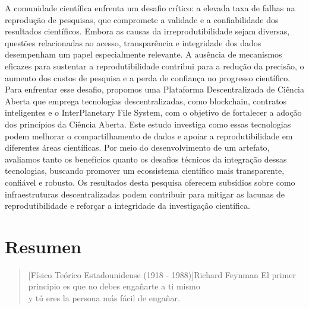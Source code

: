 \documentclass[final]{rc-book-2.14}
\begin{document}
\drop A comunidade científica enfrenta um desafio crítico: a elevada taxa de falhas na reprodução de pesquisas, que compromete a validade e a confiabilidade dos resultados científicos. Embora as causas da irreprodutibilidade sejam diversas, questões relacionadas ao acesso, transparência e integridade dos dados desempenham um papel especialmente relevante. A ausência de mecanismos eficazes para sustentar a reprodutibilidade contribui para a redução da precisão, o aumento dos custos de pesquisa e a perda de confiança no progresso científico. Para enfrentar esse desafio, propomos uma Plataforma Descentralizada de Ciência Aberta que emprega tecnologias descentralizadas, como blockchain, contratos inteligentes e o InterPlanetary File System, com o objetivo de fortalecer a adoção dos princípios da Ciência Aberta. Este estudo investiga como essas tecnologias podem melhorar o compartilhamento de dados e apoiar a reprodutibilidade em diferentes áreas científicas. Por meio do desenvolvimento de um artefato, avaliamos tanto os benefícios quanto os desafios técnicos da integração dessas tecnologias, buscando promover um ecossistema científico mais transparente, confiável e robusto. Os resultados desta pesquisa oferecem subsídios sobre como infraestruturas descentralizadas podem contribuir para mitigar as lacunas de reprodutibilidade e reforçar a integridade da investigação científica.


\chapter{Resumen}
\label{chp:general-abstract:spanish}

\begin{quotation}[Físico Teórico Estadounidense (1918 - 1988)]{Richard Feynman}
    El primer principio es que no debes engañarte a ti mismo \\ y tú eres la persona más fácil de engañar.
\end{quotation}
\end{document}
